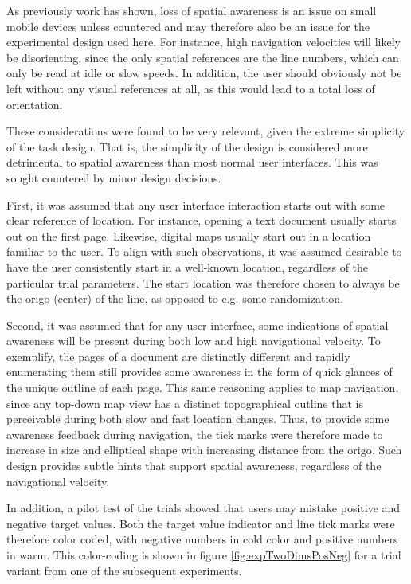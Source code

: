As previously work has shown, loss of spatial awareness is an issue on small mobile devices unless countered and may therefore also be an issue for the experimental design used here. For instance, high navigation velocities will likely be disorienting, since the only spatial references are the line numbers, which can only be read at idle or slow speeds. In addition, the user should obviously not be left without any visual references at all, as this would lead to a total loss of orientation.

These considerations were found to be very relevant, given the extreme simplicity of the task design. That is, the simplicity of the design is considered more detrimental to spatial awareness than most normal user interfaces. This was sought countered by minor design decisions. 

First, it was assumed that any user interface interaction starts out with some clear reference of location. For instance, opening a text document usually starts out on the first page. Likewise, digital maps usually start out in a location familiar to the user. To align with such observations, it was  assumed desirable to have the user consistently start in a well-known location, regardless of the particular trial parameters. The start location was therefore chosen to always be the origo (center) of the line, as opposed to e.g. some randomization. 

Second, it was assumed that for any user interface, some indications of spatial awareness will be present during both low and high navigational velocity. To exemplify, the pages of a document are distinctly different and rapidly enumerating them still provides some awareness in the form of quick glances of the unique outline of each page. This same reasoning applies to map navigation, since any top-down map view has a distinct topographical outline that is perceivable during both slow and fast location changes. Thus, to provide some awareness feedback during navigation, the tick marks were therefore made to increase in size and elliptical shape with increasing distance from the origo. Such design provides subtle hints that support spatial awareness,  regardless of the navigational velocity. 

In addition, a pilot test of the trials showed that users may mistake positive and negative target values. Both the  target value indicator and line tick marks were therefore color coded, with negative numbers in cold color and positive numbers in warm. This color-coding is shown in figure \ref{fig:expTwoDimsPosNeg} for a trial variant from one of the subsequent experiments. 

